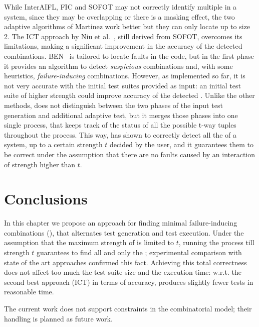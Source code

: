 \begin{tikzborder}{\cite{Gargantini16:validation}}
\begin{tikzborder}{\cite{gargantini_combinatorial_2017}}
\begin{tikzborder}{\cite{gargantini_combinatorial_2017}}
\begin{tikzborder}{\cite{garn2019}}
\begin{tikzborder}{\cite{arcaini2019achieving}}
\begin{tikzborder}{}
While InterAIFL, FIC and SOFOT may not correctly identify multiple \mfics in a system, since they may be overlapping or there is a masking effect, the two adaptive algorithms of Martinez work better but they can only locate \mfics up to size 2. The ICT approach by Niu et al.~\cite{Niu2018interleaving}, still derived from SOFOT, overcomes its limitations, making a significant improvement in the accuracy of the detected combinations. BEN~\cite{ghandehari2018combinatorial} is tailored to locate faults in the code, but in the first phase it provides an algorithm to detect \textit{suspicious} combinations and, with some heuristics, \textit{failure-inducing} combinations. However, as implemented so far, it is not very accurate with the initial test suites provided as input: an initial test suite of higher strength could improve accuracy of the detected \mfics. Unlike the other methods, \mix does not distinguish between the two phases of the input test generation and additional adaptive test, but it merges those phases into one single process, that keeps track of the status of all the possible t-way tuples throughout the process. This way, \mix has shown to correctly detect all the \mfics of a system, up to a certain strength $t$ decided by the user, and it guarantees them to be correct under the assumption that there are no faults caused by an interaction of strength higher than $t$.


\end{tikzborder}

\section{Conclusions}\label{sec:conclusions}
In this chapter we propose an approach for finding minimal failure-inducing combinations (\mfics), that alternates test generation and test execution. Under the assumption that the maximum strength of \truemfics is limited to $t$, running the process till strength $t$ guarantees to find all and only the \truemfics; experimental comparison with state of the art approaches confirmed this fact. Achieving this total correctness does not affect too much the test suite size and the execution time: w.r.t. the second best approach (ICT) in terms of accuracy, \mix produces slightly fewer tests in reasonable time.

The current work does not support constraints in the combinatorial model; their handling is planned as future work.


\end{tikzborder}
\end{tikzborder}
\end{tikzborder}
\end{tikzborder}
\end{tikzborder}
